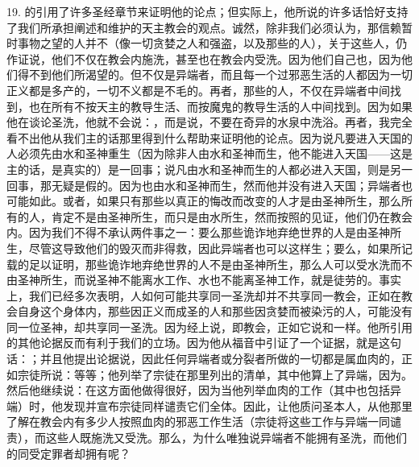 19. 的引用了许多圣经章节来证明他的论点；但实际上，他所说的许多话恰好支持了我们所承担阐述和维护的天主教会的观点。诚然，除非我们必须认为，那信赖暂时事物之望的人并不（像一切贪婪之人和强盗，以及那些的人），关于这些人，仍作证说，他们不仅在教会内施洗，甚至也在教会内受洗。因为他们自己也，因为他们得不到他们所渴望的。但不仅是异端者，而且每一个过邪恶生活的人都因为一切正义都是多产的，一切不义都是不毛的。再者，那些的人，不仅在异端者中间找到，也在所有不按天主的教导生活、而按魔鬼的教导生活的人中间找到。因为如果他在谈论圣洗，他就不会说：，而是说，不要在奇异的水泉中洗浴。再者，我完全看不出他从我们主的话那里得到什么帮助来证明他的论点。因为说凡要进入天国的人必须先由水和圣神重生（因为除非人由水和圣神而生，他不能进入天国——这是主的话，是真实的）是一回事；说凡由水和圣神而生的人都必进入天国，则是另一回事，那无疑是假的。因为也由水和圣神而生，然而他并没有进入天国；异端者也可能如此。或者，如果只有那些以真正的悔改而改变的人才是由圣神所生，那么所有的人，肯定不是由圣神所生，而只是由水所生，然而按照的见证，他们仍在教会内。因为我们不得不承认两件事之一：要么那些诡诈地弃绝世界的人是由圣神所生，尽管这导致他们的毁灭而非得救，因此异端者也可以这样生；要么，如果所记载的足以证明，那些诡诈地弃绝世界的人不是由圣神所生，那么人可以受水洗而不由圣神所生，而说圣神不能离水工作、水也不能离圣神工作，就是徒劳的。事实上，我们已经多次表明，人如何可能共享同一圣洗却并不共享同一教会，正如在教会自身这个身体内，那些因正义而成圣的人和那些因贪婪而被染污的人，可能没有同一位圣神，却共享同一圣洗。因为经上说，即教会，正如它说和一样。他所引用的其他论据反而有利于我们的立场。因为他从福音中引证了一个证据，就是这句话：；并且他提出论据说，因此任何异端者或分裂者所做的一切都是属血肉的，正如宗徒所说：等等；他列举了宗徒在那里列出的清单，其中他算上了异端，因为。然后他继续说：在这方面他做得很好，因为当他列举血肉的工作（其中也包括异端）时，他发现并宣布宗徒同样谴责它们全体。因此，让他质问圣本人，从他那里了解在教会内有多少人按照血肉的邪恶工作生活（宗徒将这些工作与异端一同谴责），而这些人既施洗又受洗。那么，为什么唯独说异端者不能拥有圣洗，而他们的同受定罪者却拥有呢？\par

